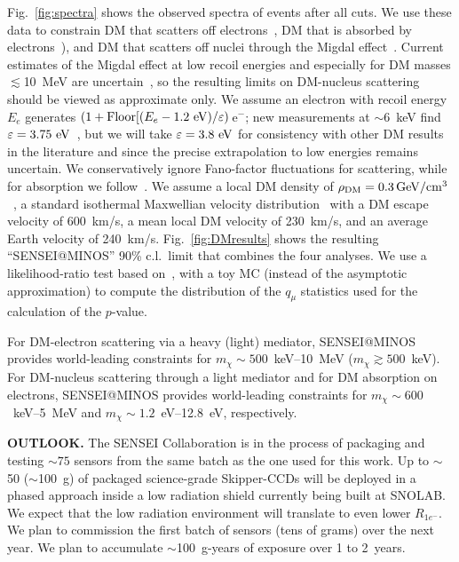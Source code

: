 \documentclass[aps,prl,twocolumn,showpacs,superscriptaddress,preprintnumbers]{revtex4-1}
\newcommand{\unit}[1]{\ensuremath{\mathrm{\,#1}}\xspace}
\newcommand{\units}[1]{\unit{#1}}
\newcommand{\e}{\unit{e^{-}}}
\newcommand{\Rs}{$R_{1e^-}$}
\begin{document}
Fig.~\ref{fig:spectra} shows the observed spectra of events after all cuts. We use these data to constrain DM that scatters off electrons~\cite{Essig:2011nj,Essig:2015cda}, DM that is absorbed by electrons~\cite{An:2014twa,Bloch:2016sjj,Hochberg:2016sqx,HenkeExp,HenkeDatabase,EDWARDS1985547}), and DM that scatters off nuclei through the Migdal effect~\cite{Essig:2019xkx}. 
Current estimates of the Migdal effect at low recoil energies and especially for DM masses $\lesssim$10~MeV are uncertain~\cite{Essig:2019xkx}, so the resulting limits on DM-nucleus scattering should be viewed as approximate only.  
We assume an electron with recoil energy $E_e$ generates $(1+{\rm Floor}[(E_e-{1.2~{\rm eV}})/\varepsilon)$\e; new measurements at $\sim$6~keV find $\varepsilon=3.75~{\rm eV}$~\cite{Rodrigues2020}, but we will take $\varepsilon=3.8~{\rm eV}$ for consistency with other DM results in the literature and since the precise extrapolation to low energies remains uncertain. We conservatively ignore Fano-factor fluctuations for scattering, while for absorption we follow~\cite{Bloch:2016sjj}. We assume a local DM density of $\rho_{\rm DM}=0.3\units{GeV/cm^3}$~\cite{Bovy:2012tw}, a standard isothermal Maxwellian velocity distribution~\cite{Lewin:1995rx} with a DM escape velocity of 600~km/s, a mean local DM velocity of 230~km/s, and an average Earth velocity of 240~km/s.  
Fig.~\ref{fig:DMresults} shows the resulting ``SENSEI@MINOS'' 90\% c.l.~limit that combines the four analyses. We use a likelihood-ratio test based on~\cite{Cowan:2010js}, with a toy MC (instead of the asymptotic approximation) to compute the distribution of the $q_{\mu}$ statistics used for the calculation of the $p$-value.

For DM-electron scattering via a heavy (light) mediator, SENSEI@MINOS provides world-leading constraints for $m_\chi\sim 500$~keV--10~MeV ($m_\chi \gtrsim 500$~keV). For DM-nucleus scattering through a light mediator and for DM absorption on electrons, SENSEI@MINOS provides world-leading constraints for $m_\chi\sim 600$~keV--5~MeV and $m_\chi\sim 1.2$~eV--12.8~eV, respectively. 

\noindent\textbf{OUTLOOK.}
The SENSEI Collaboration is in the process of packaging and testing $\sim 75$ sensors from the same batch as the one used for this work. Up to $\sim$50 ($\sim$100~g) of packaged science-grade Skipper-CCDs will be deployed in a phased approach inside a low radiation shield currently being built at SNOLAB. 
We expect that the low radiation environment will translate to even lower \Rs. We plan to commission the first batch of sensors (tens of grams) over the next year. 
We plan to accumulate $\sim$100~g-years of exposure over 1 to 2~years.
\end{document}
